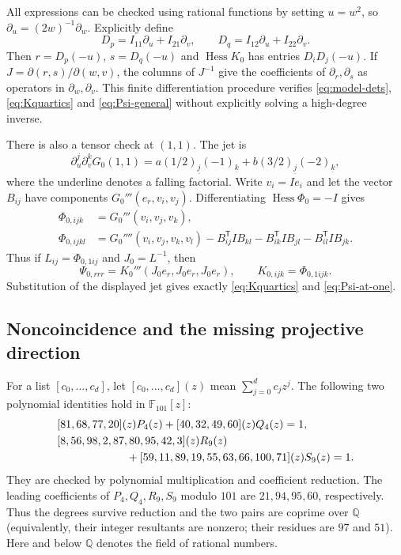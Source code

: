 \documentclass[11pt,a4paper]{article}
\numberwithin{equation}{section}
\theoremstyle{remark}
\newcommand{\Q}{\mathbb Q}
\DeclareMathOperator{\Hess}{Hess}
\begin{document}
All expressions can be checked using rational functions by setting
$u=w^2$, so $\partial_u=(2w)^{-1}\partial_w$. Explicitly define
\[
 D_p=I_{11}\partial_u+I_{21}\partial_v,\qquad
 D_q=I_{12}\partial_u+I_{22}\partial_v.
\]
Then $r=D_p(-u)$, $s=D_q(-u)$ and
$\Hess K_0$ has entries $D_iD_j(-u)$. If
$J=\partial(r,s)/\partial(w,v)$, the columns of $J^{-1}$ give the
coefficients of $\partial_r,\partial_s$ as operators in
$\partial_w,\partial_v$. This finite differentiation procedure verifies
\eqref{eq:model-dets}, \eqref{eq:Kquartics} and
\eqref{eq:Psi-general} without explicitly solving a high-degree inverse.

There is also a tensor check at $(1,1)$. The jet is
\[
 \partial_u^j\partial_v^kG_0(1,1)
   =a(1/2)_{\underline j}(-1)_{\underline k}
       +b(3/2)_{\underline j}(-2)_{\underline k},
\]
where the underline denotes a falling factorial. Write $v_i=Ie_i$ and
let the vector $B_{ij}$ have components $G_0'''(e_r,v_i,v_j)$. Differentiating
$\Hess\Phi_0=-I$ gives
\begin{align*}
 \Phi_{0,ijk}&=G_0'''(v_i,v_j,v_k),\\
 \Phi_{0,ijkl}&=G_0''''(v_i,v_j,v_k,v_l)
       -B_{ij}^{\mathsf T}IB_{kl}-B_{ik}^{\mathsf T}IB_{jl}
       -B_{il}^{\mathsf T}IB_{jk}.
\end{align*}
Thus if $L_{ij}=\Phi_{0,1ij}$ and $J_0=L^{-1}$, then
\[
 \Psi_{0,rrr}=K_0'''(J_0e_r,J_0e_r,J_0e_r),
 \qquad K_{0,ijk}=\Phi_{0,1ijk}.
\]
Substitution of the displayed jet gives exactly
\eqref{eq:Kquartics} and \eqref{eq:Psi-at-one}.

\subsection{Noncoincidence and the missing projective direction}
For a list $[c_0,\ldots,c_d]$, let $[c_0,\ldots,c_d](z)$ mean
$\sum_{j=0}^d c_jz^j$. The following two polynomial identities hold in
$\mathbb F_{101}[z]$:
\begin{align}
 &[81,68,77,20](z)P_4(z)
       +[40,32,49,60](z)Q_4(z)=1,\label{eq:bezout4}\\
 &[8,56,98,2,87,80,95,42,3](z)R_9(z)\notag\\
 &\hspace{22mm}+[59,11,89,19,55,63,66,100,71](z)S_9(z)=1.
                         \label{eq:bezout9}
\end{align}
They are checked by polynomial multiplication and coefficient reduction.
The leading coefficients of $P_4,Q_4,R_9,S_9$ modulo $101$ are
$21,94,95,60$, respectively. Thus the degrees survive reduction and the
two pairs are coprime over $\Q$ (equivalently, their integer resultants
are nonzero; their residues are $97$ and $51$). Here and below $\Q$
denotes the field of rational numbers.
\end{document}
